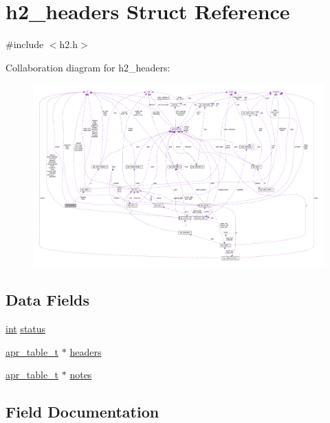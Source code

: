 \hypertarget{structh2__headers}{}\section{h2\+\_\+headers Struct Reference}
\label{structh2__headers}


{\ttfamily \#include $<$h2.\+h$>$}



Collaboration diagram for h2\+\_\+headers\+:
\nopagebreak
\begin{figure}[H]
\begin{center}
\leavevmode
\includegraphics[width=350pt]{structh2__headers__coll__graph}
\end{center}
\end{figure}
\subsection*{Data Fields}
\begin{DoxyCompactItemize}
\item 
\hyperlink{pcre_8txt_a42dfa4ff673c82d8efe7144098fbc198}{int} \hyperlink{structh2__headers_a70142770c78d4519277d43ba8902f03d}{status}
\item 
\hyperlink{structapr__table__t}{apr\+\_\+table\+\_\+t} $\ast$ \hyperlink{structh2__headers_a6b07b460b8fb9e98c8cfdeff2f9b116c}{headers}
\item 
\hyperlink{structapr__table__t}{apr\+\_\+table\+\_\+t} $\ast$ \hyperlink{structh2__headers_af0e025f1c1bd60c57424fa732cfe9359}{notes}
\end{DoxyCompactItemize}


\subsection{Field Documentation}
